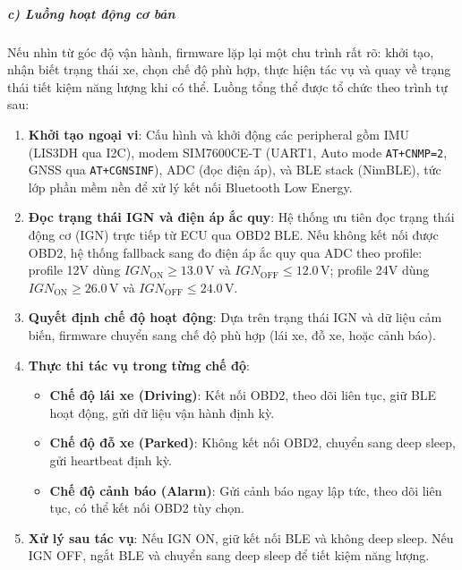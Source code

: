 \documentclass[a4paper]{extarticle}
\providecommand{\tightlist}{%
  \setlength{\itemsep}{0pt}\setlength{\parskip}{0pt}}
\begin{document}
\subparagraph{c) Luồng hoạt động cơ
bản}\label{c-luux1ed3ng-houx1ea1t-ux111ux1ed9ng-cux1a1-bux1ea3n}

Nếu nhìn từ góc độ vận hành, firmware lặp lại một chu trình rất rõ:
khởi tạo, nhận biết trạng thái xe, chọn chế độ phù hợp, thực hiện tác vụ
và quay về trạng thái tiết kiệm năng lượng khi có thể. Luồng tổng thể
được tổ chức theo trình tự sau:

\begin{enumerate}
\def\labelenumi{\arabic{enumi}.}
\item
  \textbf{Khởi tạo ngoại vi}: Cấu hình và khởi động các peripheral gồm
  IMU (LIS3DH qua I2C), modem SIM7600CE-T (UART1, Auto mode
  \texttt{AT+CNMP=2}, GNSS qua \texttt{AT+CGNSINF}), ADC (đọc điện áp),
  và BLE stack (NimBLE), tức lớp phần mềm nền để xử lý kết nối
  Bluetooth Low Energy.
\item
  \textbf{Đọc trạng thái IGN và điện áp ắc quy}: Hệ thống ưu tiên đọc
  trạng thái động cơ (IGN) trực tiếp từ ECU qua OBD2 BLE. Nếu không kết
  nối được OBD2, hệ thống fallback sang đo điện áp ắc quy qua ADC theo
  profile: profile 12V dùng \(IGN_{\mathrm{ON}} \ge 13.0\,\mathrm{V}\) và
  \(IGN_{\mathrm{OFF}} \le 12.0\,\mathrm{V}\); profile 24V dùng
  \(IGN_{\mathrm{ON}} \ge 26.0\,\mathrm{V}\) và
  \(IGN_{\mathrm{OFF}} \le 24.0\,\mathrm{V}\).
\item
  \textbf{Quyết định chế độ hoạt động}: Dựa trên trạng thái IGN và dữ
  liệu cảm biến, firmware chuyển sang chế độ phù hợp (lái xe, đỗ xe,
  hoặc cảnh báo).
\item
  \textbf{Thực thi tác vụ trong từng chế độ}:

  \begin{itemize}
  \tightlist
  \item
    \textbf{Chế độ lái xe (Driving)}: Kết nối OBD2, theo dõi liên tục,
    giữ BLE hoạt động, gửi dữ liệu vận hành định kỳ.
  \item
    \textbf{Chế độ đỗ xe (Parked)}: Không kết nối OBD2, chuyển sang deep
    sleep, gửi heartbeat định kỳ.
  \item
    \textbf{Chế độ cảnh báo (Alarm)}: Gửi cảnh báo ngay lập tức, theo
    dõi liên tục, có thể kết nối OBD2 tùy chọn.
  \end{itemize}
\item
  \textbf{Xử lý sau tác vụ}: Nếu IGN ON, giữ kết nối BLE và không deep
  sleep. Nếu IGN OFF, ngắt BLE và chuyển sang deep sleep để tiết kiệm
  năng lượng.
\end{enumerate}
\end{document}
